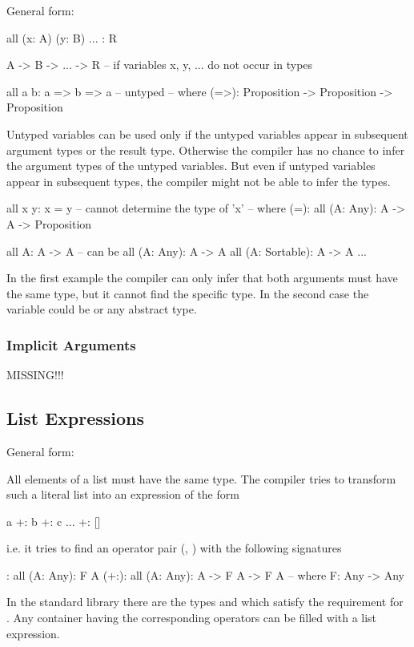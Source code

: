 General form:
%
\begin{alba}
    all (x: A) (y: B) ... : R

    A -> B -> ... -> R      -- if variables x, y, ... do not occur in types

    all a b: a => b => a    -- untyped
    -- where
    (=>): Proposition -> Proposition -> Proposition
\end{alba}

Untyped variables can be used only if the untyped variables appear in subsequent
argument types or the result type. Otherwise the compiler has no chance to infer
the argument types of the untyped variables. But even if untyped variables
appear in subsequent types, the compiler might not be able to infer the types.

\begin{alba}
    all x y: x = y              -- cannot determine the type of 'x'
    -- where
    (=): all (A: Any): A -> A -> Proposition

    all A: A -> A
    -- can be
    all (A: Any): A -> A
    all (A: Sortable): A -> A
    ...
\end{alba}
%
In the first example the compiler can only infer that both arguments must have
the same type, but it cannot find the specific type. In the second case the
variable  could be  or any abstract type.


\subsubsection{Implicit Arguments}

MISSING!!!









\vskip 5mm
\subsection{List Expressions}

General form:
%
\begin{alba}
    [a, b, c, ... ]
\end{alba}

All elements of a list must have the same type. The compiler tries to transform
such a literal list into an expression of the form
%
\begin{alba}
    a +: b +: c ... +: []
\end{alba}
%
i.e. it tries to find an operator pair (\code{[]}, \code{(+:)}) with the
following signatures
%
\begin{alba}
    []:   all (A: Any): F A
    (+:): all (A: Any): A -> F A -> F A
    -- where
    F: Any -> Any
\end{alba}
%
In the standard library there are the types  and  which
satisfy the requirement for . Any container having the corresponding
operators can be filled with a list expression.






